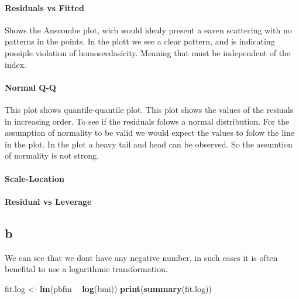 \documentclass[
]{article}
\newenvironment{Shaded}{\begin{snugshade}}{\end{snugshade}}
\newcommand{\KeywordTok}[1]{\textcolor[rgb]{0.13,0.29,0.53}{\textbf{#1}}}
\newcommand{\NormalTok}[1]{#1}
\newcommand{\OperatorTok}[1]{\textcolor[rgb]{0.81,0.36,0.00}{\textbf{#1}}}
\newcommand{\StringTok}[1]{\textcolor[rgb]{0.31,0.60,0.02}{#1}}
\begin{document}
\hypertarget{residuals-vs-fitted}{%
\paragraph{Residuals vs Fitted}\label{residuals-vs-fitted}}

Shows the Anscombe plot, wich would idealy present a eaven scattering
with no patterns in the points. In the plott we see a clear pattern, and
is indicating possiple violation of homoscedasicity. Meaning that
\epsiplon must be independent of the index.

\hypertarget{normal-q-q}{%
\paragraph{Normal Q-Q}\label{normal-q-q}}

This plot shows quantile-quantile plot. This plot shows the values of
the resiuals in increasing order. To see if the residuals folows a
normal distribution. For the assumption of normality to be valid we
would expect the values to folow the line in the plot. In the plot a
heavy tail and head can be observed. So the assumtion of normality is
not strong.

\hypertarget{scale-location}{%
\paragraph{Scale-Location}\label{scale-location}}

\hypertarget{residual-vs-leverage}{%
\paragraph{Residual vs Leverage}\label{residual-vs-leverage}}

\hypertarget{b}{%
\subsection{b}\label{b}}

We can see that we dont have any negative number, in such cases it is
often benefital to use a logarithmic transformation.

\begin{Shaded}
\begin{Highlighting}[]
\NormalTok{fit.log <-}\StringTok{ }\KeywordTok{lm}\NormalTok{(pbfm }\OperatorTok{~}\StringTok{ }\KeywordTok{log}\NormalTok{(bmi))}
\KeywordTok{print}\NormalTok{(}\KeywordTok{summary}\NormalTok{(fit.log))}
\end{Highlighting}
\end{Shaded}
\end{document}
